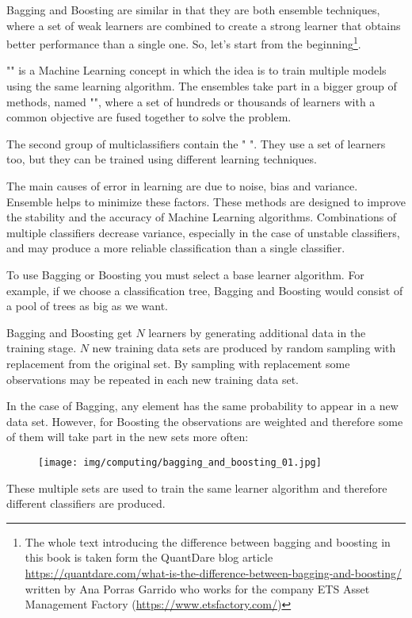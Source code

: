 	Bagging and Boosting are similar in that they are both ensemble techniques, where a set of weak learners are combined to create a strong learner that obtains better performance than a single one. So, let's start from the beginning\footnote{The whole text introducing the difference between bagging and boosting in this book is taken form the QuantDare blog article \url{https://quantdare.com/what-is-the-difference-between-bagging-and-boosting/} written by Ana Porras Garrido who works for the company ETS Asset Management Factory (\url{https://www.etsfactory.com/})}.
	
	"" is a Machine Learning concept in which the idea is to train multiple models using the same learning algorithm. The ensembles take part in a bigger group of methods, named "", where a set of hundreds or thousands of learners with a common objective are fused together to solve the problem.

	The second group of multiclassifiers contain the "
". They use a set of learners too, but they can be trained using different learning techniques. 

	The main causes of error in learning are due to noise, bias and variance. Ensemble helps to minimize these factors. These methods are designed to improve the stability and the accuracy of Machine Learning algorithms. Combinations of multiple classifiers decrease variance, especially in the case of unstable classifiers, and may produce a more reliable classification than a single classifier.

	To use Bagging or Boosting you must select a base learner algorithm. For example, if we choose a classification tree, Bagging and Boosting would consist of a pool of trees as big as we want. 
	
	Bagging and Boosting get $N$ learners by generating additional data in the training stage. $N$ new training data sets are produced by random sampling with replacement from the original set. By sampling with replacement some observations may be repeated in each new training data set.
	
	In the case of Bagging, any element has the same probability to appear in a new data set. However, for Boosting the observations are weighted and therefore some of them will take part in the new sets more often: 
	\begin{figure}[H]
		\centering
		\texttt{[image: img/computing/bagging\_and\_boosting\_01.jpg]}
	\end{figure}
	These multiple sets are used to train the same learner algorithm and therefore different classifiers are produced.
	
